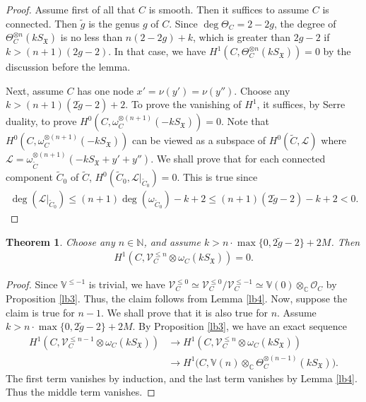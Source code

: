 \documentclass[12pt,a4paper,notitlepage]{article}
\theoremstyle{definition}
\theoremstyle{plain}
\newtheorem{thm}[df]{Theorem}
\newcommand{\fk}{\mathfrak}
\newcommand{\wtd}{\widetilde}
\newcommand{\scr}{\mathscr}
\newcommand{\SX}{S_{\fk X}}
\newcommand{\Vbb}{\mathbb V}
\newcommand{\Cbb}{\mathbb C}
\newcommand{\Nbb}{\mathbb N}
\numberwithin{equation}{section}
\begin{document}
\begin{proof}
Assume first of all that $C$ is smooth. Then it suffices to assume $C$ is connected. Then $\wtd g$ is the genus $g$ of $C$. Since $\deg\Theta_C=2-2g$, the degree of $\Theta_C^{\otimes n}(k\SX)$ is no less than $n(2-2g)+k$, which is greater than $2g-2$ if $k>(n+1)(2g-2)$. In that case, we have $H^1(C,\Theta_C^{\otimes n}(k\SX))=0$ by the discussion before the lemma.

Next, assume $C$ has one node $x'=\nu(y')=\nu(y'')$. Choose any $k>(n+1)(2\wtd g-2)+2$. To prove the vanishing of $H^1$, it suffices, by Serre duality, to prove $H^0(C,\omega_C^{\otimes(n+1)}(-k\SX))=0$. Note that $H^0(C,\omega_C^{\otimes(n+1)}(-k\SX))$ can be viewed as a subspace of $H^0(\wtd C,\scr L)$ where $\scr L=\omega_{\wtd C}^{\otimes(n+1)}(-k\SX+y'+y'')$. We shall prove that for each connected component $\wtd C_0$ of $\wtd C$, $H^0(\wtd C_0,\scr L|_{\wtd C_0})=0$. This is true since
\begin{align*}
\deg(\scr L|_{\wtd C_0})\leq (n+1)\deg(\omega_{\wtd C_0})-k+2\leq (n+1)(2\wtd g-2)-k+2<0.
\end{align*}
\end{proof}



\begin{thm}\label{lb9}
Choose any $n\in\Nbb$, and assume $k>n\cdot\max\{0,2\wtd g-2\}+2M$. Then
\begin{align*}
H^1(C,\scr V_C^{\leq n}\otimes\omega_C(k\SX))=0.
\end{align*}
\end{thm}

\begin{proof}
Since $\Vbb^{\leq-1}$ is trivial, we have $\scr V_C^{\leq 0}\simeq \scr V_C^{\leq 0}/\scr V_C^{\leq -1}\simeq\Vbb(0)\otimes_\Cbb\scr O_C$ by Proposition \ref{lb3}. Thus, the claim follows from Lemma \ref{lb4}. Now, suppose the claim is true for $n-1$. We shall prove that it is also true for $n$. Assume $k>n\cdot\max\{0,2\wtd g-2\}+2M$.  By Proposition \ref{lb3}, we have an exact sequence
\begin{align*}
H^1(C,\scr V_C^{\leq n-1}\otimes\omega_C(k\SX))&\rightarrow H^1(C,\scr V_C^{\leq n}\otimes\omega_C(k\SX))\nonumber\\
&\rightarrow H^1\big(C,\Vbb(n)\otimes_{\Cbb}\Theta_C^{\otimes(n-1)}(k\SX)\big).
\end{align*}
The first term vanishes by induction, and the last term vanishes by Lemma \ref{lb4}. Thus the middle term vanishes.
\end{proof}
\end{document}
